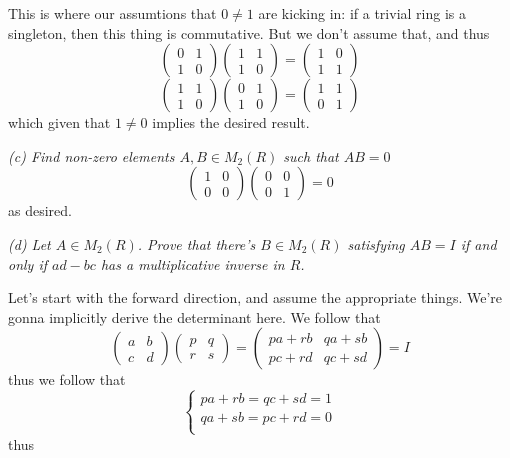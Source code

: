 \documentclass[11pt,oneside,titlepage]{book}
\begin{document}
This is where our assumtions that $0 \neq 1$ are kicking in: if
a trivial ring is a singleton, then this thing is commutative.
But we don't assume that, and thus
$$
\begin{pmatrix}
  0 & 1 \\
  1 & 0
\end{pmatrix}
\begin{pmatrix}
  1 & 1 \\
  1 & 0
\end{pmatrix}
=
\begin{pmatrix}
  1 & 0 \\
  1 & 1
\end{pmatrix}
$$
$$
\begin{pmatrix}
  1 & 1 \\
  1 & 0
\end{pmatrix}
\begin{pmatrix}
  0 & 1 \\
  1 & 0
\end{pmatrix}
=
\begin{pmatrix}
  1 & 1 \\
  0 & 1
\end{pmatrix}
$$
which given that $1 \neq 0$ implies the desired result.

\textit{(c) Find non-zero elements $A, B \in M_2(R)$ such that $AB = 0$}
$$
\begin{pmatrix}
  1 & 0 \\
  0 & 0
\end{pmatrix}
\begin{pmatrix}
  0 & 0 \\
  0 & 1
\end{pmatrix} = 0
$$
as desired.

\textit{(d) Let $A \in M_2(R)$. Prove that there's $B \in M_2(R)$
satisfying $AB = I$ if and only if $ad - bc$ has a multiplicative
inverse in $R$.}

Let's start with the forward direction, and assume the appropriate
things. We're gonna implicitly derive the determinant here. We follow that
$$
\begin{pmatrix}
  a & b \\
  c & d
\end{pmatrix}
\begin{pmatrix}
  p & q \\
  r & s
\end{pmatrix} =
\begin{pmatrix}
  pa + rb & qa + sb \\
  pc + rd & qc + sd  
\end{pmatrix} = I
$$
thus we follow that
$$
\begin{cases}
  pa + rb = qc + sd = 1 \\
  qa + sb = pc + rd = 0 \\
\end{cases}
$$
thus
\end{document}
